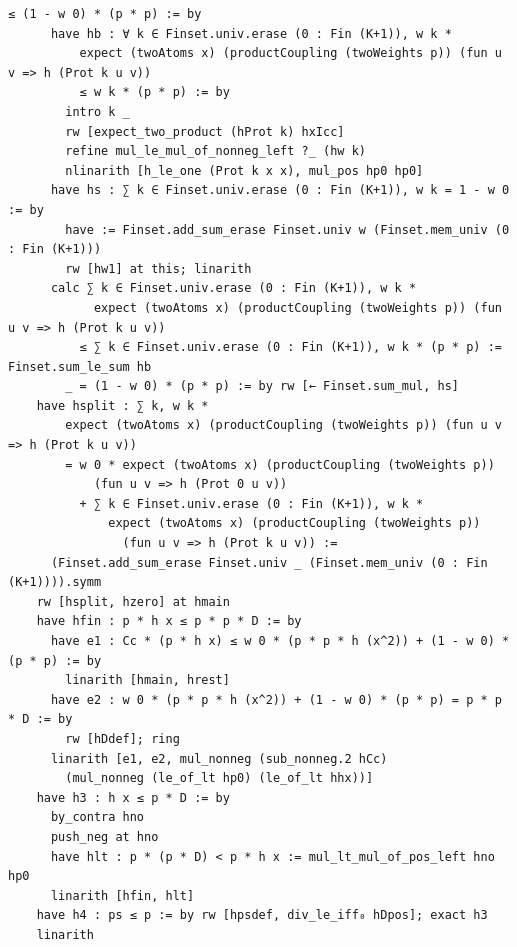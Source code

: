 \documentclass[11pt,a4paper]{article}
\theoremstyle{definition}
\theoremstyle{remark}
\begin{document}
\begin{Verbatim}[fontsize=\scriptsize,formatcom=\leanmono,samepage=false]
        ≤ (1 - w 0) * (p * p) := by
      have hb : ∀ k ∈ Finset.univ.erase (0 : Fin (K+1)), w k *
          expect (twoAtoms x) (productCoupling (twoWeights p)) (fun u v => h (Prot k u v))
          ≤ w k * (p * p) := by
        intro k _
        rw [expect_two_product (hProt k) hxIcc]
        refine mul_le_mul_of_nonneg_left ?_ (hw k)
        nlinarith [h_le_one (Prot k x x), mul_pos hp0 hp0]
      have hs : ∑ k ∈ Finset.univ.erase (0 : Fin (K+1)), w k = 1 - w 0 := by
        have := Finset.add_sum_erase Finset.univ w (Finset.mem_univ (0 : Fin (K+1)))
        rw [hw1] at this; linarith
      calc ∑ k ∈ Finset.univ.erase (0 : Fin (K+1)), w k *
            expect (twoAtoms x) (productCoupling (twoWeights p)) (fun u v => h (Prot k u v))
          ≤ ∑ k ∈ Finset.univ.erase (0 : Fin (K+1)), w k * (p * p) := Finset.sum_le_sum hb
        _ = (1 - w 0) * (p * p) := by rw [← Finset.sum_mul, hs]
    have hsplit : ∑ k, w k *
        expect (twoAtoms x) (productCoupling (twoWeights p)) (fun u v => h (Prot k u v))
        = w 0 * expect (twoAtoms x) (productCoupling (twoWeights p))
            (fun u v => h (Prot 0 u v))
          + ∑ k ∈ Finset.univ.erase (0 : Fin (K+1)), w k *
              expect (twoAtoms x) (productCoupling (twoWeights p))
                (fun u v => h (Prot k u v)) :=
      (Finset.add_sum_erase Finset.univ _ (Finset.mem_univ (0 : Fin (K+1)))).symm
    rw [hsplit, hzero] at hmain
    have hfin : p * h x ≤ p * p * D := by
      have e1 : Cc * (p * h x) ≤ w 0 * (p * p * h (x^2)) + (1 - w 0) * (p * p) := by
        linarith [hmain, hrest]
      have e2 : w 0 * (p * p * h (x^2)) + (1 - w 0) * (p * p) = p * p * D := by
        rw [hDdef]; ring
      linarith [e1, e2, mul_nonneg (sub_nonneg.2 hCc)
        (mul_nonneg (le_of_lt hp0) (le_of_lt hhx))]
    have h3 : h x ≤ p * D := by
      by_contra hno
      push_neg at hno
      have hlt : p * (p * D) < p * h x := mul_lt_mul_of_pos_left hno hp0
      linarith [hfin, hlt]
    have h4 : ps ≤ p := by rw [hpsdef, div_le_iff₀ hDpos]; exact h3
    linarith


\end{Verbatim}
\end{document}
